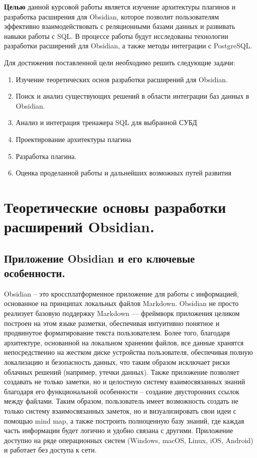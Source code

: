 \documentclass[14pt]{extarticle}
\begin{document}
	\textbf{Целью} данной курсовой работы является изучение архитектуры плагинов и разработка расширения для Obsidian, которое позволит пользователям эффективно взаимодействовать с реляционными базами данных и развивать навыки работы с SQL. В процессе работы будут исследованы технологии разработки расширений для Obsidian, а также методы интеграции с PostgreSQL.
	\vspace{1em}
	
	Для достижения поставленной цели необходимо решить следующие
	задачи:
	\begin{enumerate}
		\item Изучение теоретических основ разработки расширений для Obsidian.
		\item Поиск и анализ существующих решений в области интеграции баз
		данных в Obsidian.
		\item Анализ и интеграция тренажера SQL для выбранной СУБД
		\item Проектирование архитектуры плагина
		\item Разработка плагина.
		\item Оценка проделанной работы и дальнейших возможных путей развития
	\end{enumerate}
	
	
	\newpage
	\section{Теоретические основы разработки расширений Obsidian.}
	\subsection{Приложение Obsidian и его ключевые особенности.}
	\vspace{1em}
	Obsidian – это кроссплатформенное приложение для работы с информацией, основанное на принципах локальных файлов Markdown. Obsidian не просто реализует базовую поддержку Markdown — фреймворк приложения целиком построен на этом языке разметки, обеспечивая интуитивно понятное и продвинутое форматирование текста пользователем. Более того, благодаря архитектуре, основанной на локальном хранении файлов, все данные хранятся непосредственно на жестком диске устройства пользователя, обеспечивая полную локализацию и безопасность данных, что таким образом исключает риски облачных решений (например, утечки данных). Также приложение позволяет создавать не только заметки, но и целостную систему взаимосвязанных знаний благодаря его функциональной особенности – создание двусторонних ссылок между файлами. Таким образом, пользователь имеет возможность создать не только систему взаимосвязанных заметок, но и визуализировать свои идеи с помощью mind map, а также построить полноценную базу знаний, где каждая часть информации будет логично и удобно связана с другими. Приложение доступно на ряде операционных систем (Windows, macOS, Linux, iOS, Android) и работает без доступа к сети.
	\vspace{1em}
	
\end{document}
